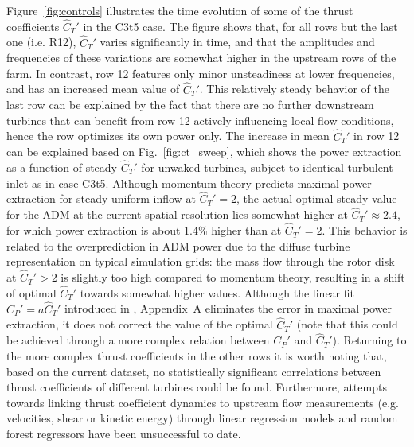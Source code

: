 \documentclass[wes, manuscript]{copernicus}
\begin{document}
Figure~\ref{fig:controls} illustrates the time evolution of some of  the thrust coefficients $\widehat{C}_{T}'$ in the C3t5 case. The figure shows that, for all rows but the last one (i.e. R12), $\widehat{C}_{T}'$ varies significantly in time, and that the amplitudes and frequencies of these variations are somewhat higher in the upstream rows of the farm. In contrast, row 12 features only minor unsteadiness at lower frequencies, and has an increased mean value of $\widehat{C}_{T}'$. This relatively steady behavior of the last row can be explained by the fact that there are no further downstream turbines that can benefit from row 12 actively influencing local flow conditions, hence the row optimizes its own power only. The increase in mean $\widehat{C}_{T}'$ in row 12 can be explained based on Fig.~\ref{fig:ct_sweep}, which shows the power extraction as a function of steady $\widehat{C}_{T}'$ for unwaked turbines, subject to identical turbulent inlet as in case C3t5. Although momentum theory predicts maximal power extraction for steady uniform inflow at $\widehat{C}_{T}' = 2$, the actual optimal steady value for the ADM at the current spatial resolution lies somewhat higher at $\widehat{C}_{T}' \approx 2.4$, for which power extraction is about 1.4\% higher than at $\widehat{C}_{T}' = 2$. This behavior is related to the overprediction in ADM power due to the diffuse turbine representation on typical simulation grids: the mass flow through the rotor disk at $\widehat{C}_{T}' > 2$ is slightly too high compared to momentum theory, resulting in a  shift of optimal $\widehat{C}_{T}'$ towards somewhat higher values. Although the linear fit $C_P' = a \widehat{C}_{T}'$ introduced in \cite{munters2017optimal}, Appendix~A eliminates the error in maximal power extraction, it does not correct the value of the optimal $\widehat{C}_{T}'$ (note that this could be achieved through a more complex relation between $C_P'$ and $\widehat{C}_{T}'$). Returning to the more complex thrust coefficients in the other rows it is worth noting that, based on the current dataset, no statistically significant correlations between thrust coefficients of different turbines could be found. Furthermore, attempts towards linking thrust coefficient dynamics to upstream flow measurements (e.g. velocities, shear or kinetic energy) through linear regression models and random forest regressors have been unsuccessful to date. 
\end{document}
